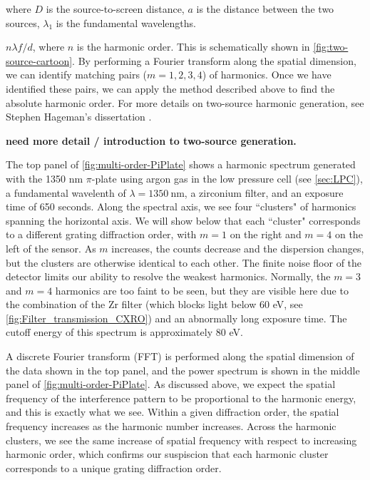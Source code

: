 where $D$ is the source-to-screen distance, $a$ is the distance between the two sources, $\lambda_1$ is the fundamental wavelengths. 

$n \lambda f/d$, where $n$ is the harmonic order. This is schematically shown in \cref{fig:two-source-cartoon}. By performing a Fourier transform along the spatial dimension, we can identify matching pairs ($m=1,2,3,4$) of harmonics. Once we have identified these pairs, we can apply the method described above to find the absolute harmonic order. For more details on two-source harmonic generation, see Stephen Hageman's dissertation \cite{hagemanComplexAttosecondTransientAbsorption2020}.

\textbf{need more detail / introduction to two-source generation.}

The top panel of \cref{fig:multi-order-PiPlate} shows a harmonic spectrum generated with the 1350 nm $\pi$-plate using argon gas in the low pressure cell (see \cref{sec:LPC}), a fundamental wavelenth of $\lambda=1350 \ \textrm{nm}$, a zirconium filter, and an exposure time of 650 seconds. Along the spectral axis, we see four ``clusters" of harmonics spanning the horizontal axis. We will show below that each ``cluster" corresponds to a different grating diffraction order, with $m=1$ on the right and $m=4$ on the left of the sensor. As $m$ increases, the counts decrease and the dispersion changes, but the clusters are otherwise identical to each other. The finite noise floor of the detector limits our ability to resolve the weakest harmonics. Normally, the $m=3$ and $m=4$ harmonics are too faint to be seen, but they are visible here due to the combination of the Zr filter (which blocks light below 60 eV, see \cref{fig:Filter_transmission_CXRO}) and an abnormally long exposure time. The cutoff energy of this spectrum is approximately 80 eV.

A discrete Fourier transform (FFT) is performed along the spatial dimension of the data shown in the top panel, and the power spectrum is shown in the middle panel of \cref{fig:multi-order-PiPlate}. As discussed above, we expect the spatial frequency of the interference pattern to be proportional to the harmonic energy, and this is exactly what we see. Within a given diffraction order, the spatial frequency increases as the harmonic number increases. Across the harmonic clusters, we see the same increase of spatial frequency with respect to increasing harmonic order, which confirms our suspiscion that each harmonic cluster corresponds to a unique grating diffraction order.

